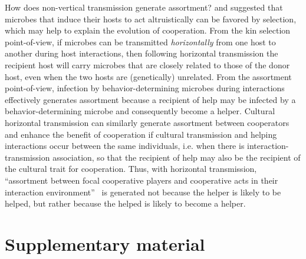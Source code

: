 \documentclass[12pt]{extarticle}
\newcommand{\beginsupplement}{%
      	\setcounter{table}{0}
        \renewcommand{\thetable}{S\arabic{table}}%
        \setcounter{figure}{0}
        \renewcommand{\thefigure}{S\arabic{figure}}%
		\setcounter{equation}{0}
        \renewcommand{\theequation}{A\arabic{equation}}%
}
\begin{document}
How does non-vertical transmission generate assortment? 
\citet{lewin2017microbes} and \citet{lewin2020rockpaperscissors} 
suggested that microbes that induce their hosts to act altruistically can be favored by selection, which may help to explain the evolution of cooperation. 
From the kin selection point-of-view, if microbes can be transmitted \emph{horizontally} from one host to another during host interactions, then following horizontal transmission the recipient host will carry microbes that are closely related to those of the donor host, 
even when the two hosts are (genetically) unrelated. 
From the assortment point-of-view,
infection by behavior-determining microbes during interactions effectively generates assortment because a recipient of help may be infected by a behavior-determining microbe and consequently become a helper.
Cultural horizontal transmission can similarly generate assortment between cooperators and enhance the benefit of cooperation if cultural transmission and helping interactions occur between the same individuals, i.e. when there is interaction-transmission association, so that the recipient of help may also be the recipient of the cultural trait for cooperation. 
Thus, with horizontal transmission, ``assortment between focal cooperative players and cooperative acts in their interaction
environment''~\citep{Fletcher2009assortment} is generated not because the helper is likely to be helped, but rather because the helped is likely to become a helper.


\newpage










\newpage
\section*{\huge{Supplementary material}}
\beginsupplement %
\end{document}

